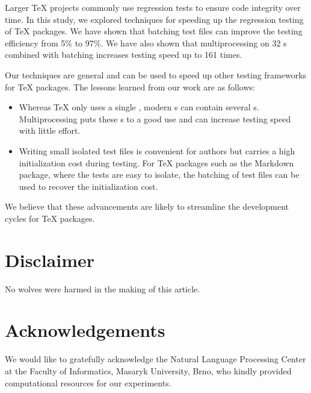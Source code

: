 \documentclass[final]{ltugboat}
\begin{document}
Larger \TeX{} projects commonly use regression tests to ensure code integrity over time.
In this study, we explored techniques for speeding up the regression testing of \TeX{} packages. We have shown that batching test files can improve the testing efficiency from 5\% to 97\%. We have also shown that multiprocessing on 32 s combined with batching increases testing speed up to 161 times.

Our techniques are general and can be used to speed up other testing frameworks for \TeX{} packages. The lessons learned from our work are as follows:
\begin{itemize}
\item Whereas \TeX{} only uses a single , modern s can contain several s. Multiprocessing puts these s to a good use and can increase testing speed with little effort.
\item Writing small isolated test files is convenient for authors but carries a high initialization cost during testing. For \TeX{} packages such as the Markdown package, where the tests are easy to isolate, the batching of test files can be used to recover the initialization cost.
\end{itemize}
We believe that these advancements are likely to streamline the development cycles for \TeX{} packages.

\medskip
\noindent


\section*{Disclaimer}
No wolves were harmed in the making of this article.

\section*{Acknowledgements}
We would like to gratefully acknowledge the Natural Language Processing Center at the Faculty of Informatics, Masaryk University, Brno, who kindly provided computational resources for our experiments.


\begingroup
\gappto{\UrlBreaks}{\UrlOrds}
\RaggedRight

\endgroup

\makesignature
\end{document}
